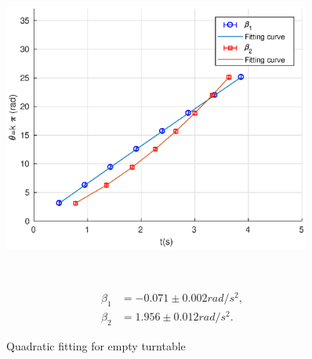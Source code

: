     \begin{figure}[H]
    \centering
    \begin{minipage}{0.6\textwidth}    
        \includegraphics[width=0.9\textwidth]{images/1}
        \caption{Quadratic fitting for empty turntable}\label{fig_1}
    \end{minipage}
    ~
    \begin{minipage}{0.35\textwidth}
        \[
        \begin{split}
            \beta_1&=-0.071\pm 0.002rad/s^2,\\
            \beta_2&=1.956\pm 0.012rad/s^2.
        \end{split}
        \]
    \end{minipage}
    \end{figure}

